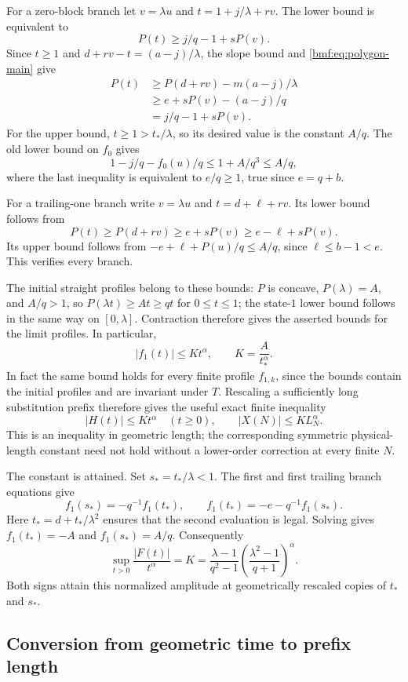 \documentclass[11pt]{article}
\numberwithin{equation}{section}
\theoremstyle{definition}
\theoremstyle{remark}
\begin{document}
For a zero-block branch let $v=\lambda u$ and
$t=1+j/\lambda+rv$. The lower bound is equivalent to
\[
 P(t)\geq j/q-1+sP(v).
\]
Since $t\geq1$ and $d+rv-t=(a-j)/\lambda$, the slope bound and
\eqref{bmf:eq:polygon-main} give
\begin{align*}
 P(t)&\geq P(d+rv)-m(a-j)/\lambda\\
     &\geq e+sP(v)-(a-j)/q\\
     &=j/q-1+sP(v).
\end{align*}
For the upper bound, $t\geq1>t_*/\lambda$, so its desired value is the
constant $A/q$. The old lower bound on $f_0$ gives
\[
 1-j/q-f_0(u)/q\leq1+A/q^3\leq A/q,
\]
where the last inequality is equivalent to $e/q\geq1$, true since
$e=q+b$.

For a trailing-one branch write $v=\lambda u$ and
$t=d+\ell+rv$. Its lower bound follows from
\[
 P(t)\geq P(d+rv)\geq e+sP(v)\geq e-\ell+sP(v).
\]
Its upper bound follows from
$-e+\ell+P(u)/q\leq A/q$, since $\ell\leq b-1<e$.
This verifies every branch.

The initial straight profiles belong to these bounds: $P$ is concave,
$P(\lambda)=A$, and $A/q>1$, so $P(\lambda t)\geq At\geq qt$
for $0\leq t\leq1$; the state-$1$ lower bound follows in the same way
on $[0,\lambda]$. Contraction therefore gives the asserted bounds for
the limit profiles. In particular,
\[
 |f_1(t)|\leq Kt^\alpha,
 \qquad K=\frac A{t_*^\alpha}.
\]
In fact the same bound holds for every finite profile $f_{1,k}$, since the
bounds contain the initial profiles and are invariant under $T$. Rescaling
a sufficiently long substitution prefix therefore gives the useful exact
finite inequality
\[
 |H(t)|\leq Kt^\alpha\quad(t\geq0),
 \qquad |X(N)|\leq K L_N^\alpha.
\]
This is an inequality in geometric length; the corresponding symmetric
physical-length constant need not hold without a lower-order correction at
every finite $N$.

The constant is attained. Set $s_*=t_*/\lambda<1$. The first and first
trailing branch equations give
\[
 f_1(s_*)=-q^{-1}f_1(t_*),\qquad
 f_1(t_*)=-e-q^{-1}f_1(s_*).
\]
Here $t_*=d+t_*/\lambda^2$ ensures that the second evaluation is legal.
Solving gives $f_1(t_*)=-A$ and $f_1(s_*)=A/q$. Consequently
\[
 \sup_{t>0}\frac{|F(t)|}{t^\alpha}
 =K
 =\frac{\lambda-1}{q^2-1}
   \left(\frac{\lambda^2-1}{q+1}\right)^\alpha.
\]
Both signs attain this normalized amplitude at geometrically rescaled
copies of $t_*$ and $s_*$.

\subsection{Conversion from geometric time to prefix length}
\end{document}
